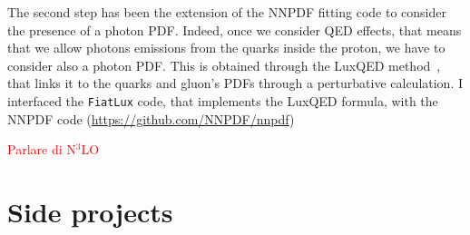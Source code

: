 \documentclass[11pt,a4paper]{moderncv}        %
\begin{document}
The second step has been the extension of the NNPDF fitting code to consider the presence of a photon PDF.
Indeed, once we consider QED effects, that means that we allow photons emissions from the quarks inside the proton, we have to consider also
a photon PDF.
This is obtained through the LuxQED method~\cite{Manohar:2016nzj, Manohar:2017eqh}, that links it to the quarks and gluon's PDFs
through a perturbative calculation.
I interfaced the \texttt{FiatLux} code, that implements the LuxQED formula, with the NNPDF code (\url{https://github.com/NNPDF/nnpdf})

\textcolor{red}{Parlare di N$^3$LO}

\section{Side projects}


\end{document}
